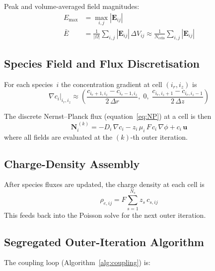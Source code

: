 \documentclass[11pt,a4paper]{article}
\begin{document}
Peak and volume-averaged field magnitudes:
\begin{align}
  E_{\max} &= \max_{i,j} |\bm{E}_{ij}| \label{eq:Emax} \\
  \bar{E}  &= \frac{1}{|\Omega|}\sum_{i,j}|\bm{E}_{ij}|\,\Delta V_{ij}
             \approx \frac{1}{N_{\mathrm{cells}}}\sum_{i,j}|\bm{E}_{ij}|
             \label{eq:Eavg}
\end{align}

\subsection{Species Field and Flux Discretisation}

For each species~$i$ the concentration gradient at cell $(i_r, i_z)$ is
\begin{equation}\label{eq:grad_c}
  \nabla c_i\big|_{i_r, i_z} \approx
  \left(
    \frac{c_{i_r+1,i_z} - c_{i_r-1,i_z}}{2\,\Delta r},\;
    0,\;
    \frac{c_{i_r,i_z+1} - c_{i_r,i_z-1}}{2\,\Delta z}
  \right)
\end{equation}

The discrete Nernst--Planck flux (equation~\eqref{eq:NP}) at a cell is then
\begin{equation}\label{eq:NP_discrete}
  \bm{N}_{i}^{\,(k)} = -D_i\,\nabla c_i
                       - z_i\,\mu_i\,F\,c_i\,\nabla\phi
                       + c_i\,\bm{u}
\end{equation}
where all fields are evaluated at the $(k)$-th outer iteration.

\subsection{Charge-Density Assembly}

After species fluxes are updated, the charge density at each cell is
\begin{equation}\label{eq:rho_e_assembly}
  \rho_{e,ij} = F \sum_{s=1}^{N_s} z_s\,c_{s,ij}
\end{equation}
This feeds back into the Poisson solve for the next outer iteration.

\subsection{Segregated Outer-Iteration Algorithm}

The coupling loop (Algorithm~\ref{alg:coupling}) is:
\end{document}
